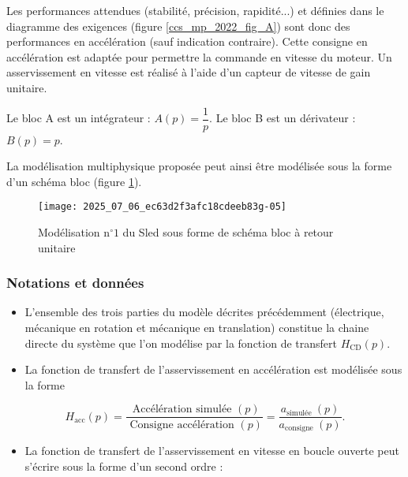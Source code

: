 Les performances attendues (stabilité, précision, rapidité...) et définies dans le diagramme des exigences (figure \ref{ccs_mp_2022_fig_A}) sont donc des performances en accélération (sauf indication contraire). Cette consigne en accélération est adaptée pour permettre la commande en vitesse du moteur. Un asservissement en vitesse est réalisé à l'aide d'un capteur de vitesse de gain unitaire.
\fi

\ifprof
\begin{corrige}
Le bloc A est un intégrateur : $A(p) = \dfrac{1}{p}$.
Le bloc B est un dérivateur : $B(p) = p$.
\end{corrige}
\else
\fi

\ifprof
\else
La modélisation multiphysique proposée peut ainsi être modélisée sous la forme d'un schéma bloc (figure \ref{ccs_mp_2022_fig_07}).

\begin{figure}[!h]
\centering
\texttt{[image: 2025\_07\_06\_ec63d2f3afc18cdeeb83g-05]}
\caption{\label{ccs_mp_2022_fig_07}Modélisation $\mathrm{n}^{\circ} 1$ du Sled sous forme de schéma bloc à retour unitaire}
\end{figure}




\subsubsection*{Notations et données}
\begin{itemize}
  \item L'ensemble des trois parties du modèle décrites précédemment (électrique, mécanique en rotation et mécanique en translation) constitue la chaine directe du système que l'on modélise par la fonction de transfert $H_{\mathrm{CD}}(p)$.
  \item La fonction de transfert de l'asservissement en accélération est modélisée sous la forme
\end{itemize}

$$
H_{\mathrm{acc}}(p)=\frac{\text { Accélération simulée }(p)}{\text { Consigne accélération }(p)}=\frac{a_{\text {simulée }}(p)}{a_{\text {consigne }}(p)} .
$$

\begin{itemize}
  \item La fonction de transfert de l'asservissement en vitesse en boucle ouverte peut s'écrire sous la forme d'un second ordre :
\end{itemize}

